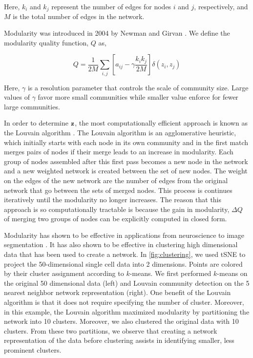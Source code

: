 Here, $k_{i}$ and $k_{j}$ represent the number of edges for nodes $i$ and $j$, respectively, and $M$ is the total number of edges in the network. 

\indent Modularity was introduced in 2004 by Newman and Girvan \cite{newmangirvan}. We define the modularity quality function, $Q$ as,

\begin{equation}
Q=\frac{1}{2M}\sum_{i,j}\left[a_{ij}-\gamma \frac{k_{i}k_{j}}{2M}\right]\delta(z_{i},z_{j})
\end{equation} 

Here, $\gamma$ is a resolution parameter \cite{resParam} that controls the scale of community size. Large values of $\gamma$ favor more small communities while smaller value enforce for fewer large communities. 

\indent In order to determine ${\bf z}$, the most computationally efficient approach is known as the Louvain algorithm \cite{blondel}. The Louvain algorithm is an agglomerative heuristic, which initially starts with each node in its own community and in the first match merges pairs of nodes if their merge leads to an increase in modularity. Each group of nodes assembled after this first pass becomes a new node in the network and a new weighted network is created between the set of new nodes. The weight on the edges of the new network are the number of edges from the original network that go between the sets of merged nodes. This process is continues iteratively until the modularity no longer increases. The reason that this approach is so computationally tractable is because the gain in modularity, $\Delta Q$ of merging two groups of nodes can be explicitly computed in closed form.

\indent Modularity has shown to be effective in applications from neuroscience \cite{hierarchicalmod} to image segmentation \cite{browet}. It has also shown to be effective in clustering high dimensional data that has been used to create a network. In \ref{fig:clustering}, we used tSNE \cite{TwoD} to project the 50-dimensional single cell data into 2 dimensions. Points are colored by their cluster assignment according to $k$-means. We first performed $k$-means on the original 50 dimensional data (left) and Louvain community detection on the 5 nearest neighbor network representation (right). One benefit of the Louvain algorithm is that it does not require specifying the number of cluster. Moreover, in this example, the Louvain algorithm maximized modularity by partitioning the network into 10 clusters. Moreover, we also clustered the original data with 10 clusters. From these two partitions, we observe that creating a network representation of the data before clustering assists in identifying smaller, less prominent clusters.


